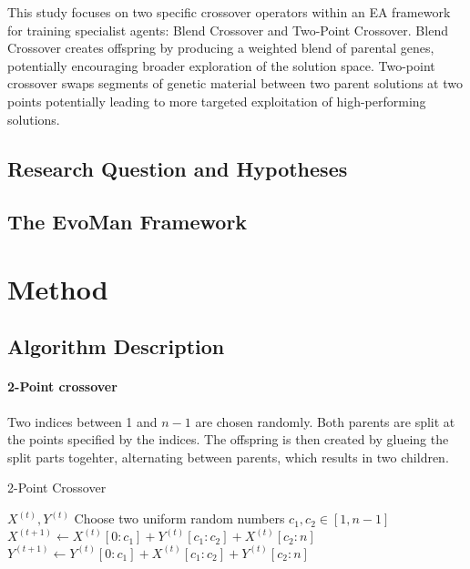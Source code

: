 This study focuses on two specific crossover operators within an EA framework for training specialist agents: Blend Crossover and Two-Point Crossover.
Blend Crossover creates offspring by producing a weighted blend of parental genes, potentially encouraging broader exploration of the solution space.
Two-point crossover swaps segments of genetic material between two parent solutions at two points potentially leading to more targeted exploitation of high-performing solutions.

\subsection{Research Question and Hypotheses}

\subsection{The EvoMan Framework}


\section{Method}
\subsection{Algorithm Description}
\paragraph{2-Point crossover}
Two indices between 1 and $n-1$ are chosen randomly.
Both parents are split at the points specified by the indices.
The offspring is then created by glueing the split parts togehter, alternating between parents, which results in two children.
\begin{algorithm}
\caption{2-Point Crossover}\label{alg:2px}
\begin{algorithmic}

\Require $X^{(t)}, Y^{(t)}$
\State Choose two uniform random numbers $c_1, c_2 \in [1, n-1]$
\State $X^{(t+1)} \gets X^{(t)}[0:c_1] + Y^{(t)}[c_1:c_2] + X^{(t)}[c_2:n]$
\State $Y^{(t+1)} \gets Y^{(t)}[0:c_1] + X^{(t)}[c_1:c_2] + Y^{(t)}[c_2:n]$

\end{algorithmic}
\end{algorithm}


